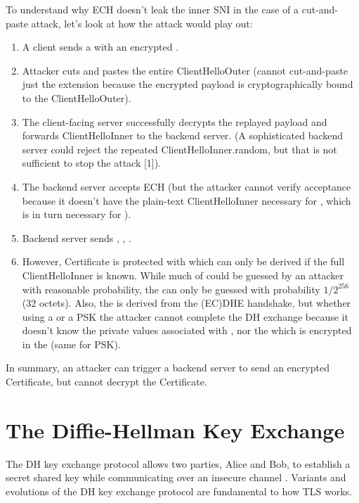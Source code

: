 To understand why ECH doesn't leak the inner SNI in the case of a cut-and-paste attack, let's look at how the attack would play out:
\begin{enumerate}
    \item A client sends a  with an encrypted .
    \item Attacker cuts and pastes the entire ClientHelloOuter (cannot cut-and-paste just the  extension because the encrypted payload is cryptographically bound to the ClientHelloOuter).
    \item The client-facing server successfully decrypts the replayed  payload and forwards ClientHelloInner to the backend server. (A sophisticated backend server could reject the repeated ClientHelloInner.random, but that is not sufficient to stop the attack [1]).
    \item The backend server accepts ECH (but the attacker cannot verify acceptance because it doesn't have the plain-text ClientHelloInner necessary for , which is in turn necessary for ).
    \item Backend server sends , , .
    \item However, {Certificate} is protected with \var{\shts} which can only be derived if the full ClientHelloInner is known. While much of  could be guessed by an attacker with reasonable probability, the  can only be guessed with probability $1/2^{256}$ (32 octets). Also, the \var{\shts} is derived from the (EC)DHE handshake, but whether using a  or a PSK the attacker cannot complete the DH exchange because it doesn't know the private values associated with , nor the  which is encrypted in the  (same for PSK).
\end{enumerate}


In summary, an attacker can trigger a backend server to send an encrypted {Certificate}, but cannot decrypt the {Certificate}.
\section{ The Diffie-Hellman Key Exchange }
The \ac{DH} key exchange protocol allows two parties, Alice and Bob, to establish a secret shared key
while communicating over an insecure channel \cite{diffie-hellman-1976}.
Variants and evolutions of the \ac{DH} key exchange protocol
are fundamental to how \ac{TLS} works.


